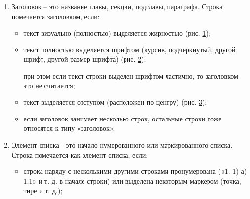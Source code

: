 \documentclass{ProcISPRAS}
\begin{document}
\begin{enumerate}
	\item Заголовок -- это название главы, секции, подглавы, параграфа. Строка помечается заголовком, если:
	\begin{itemize}
		\item текст визуально (полностью) выделяется жирностью (рис. \ref{fig:1});
		
		\begin{figure}[ht]
		    \label{fig:1}
		\end{figure}
		
		\item текст полностью выделяется шрифтом (курсив, подчеркнутый, другой шрифт, другой размер шрифта) (рис. \ref{fig:2});
		
		\begin{figure}[ht]
		    \label{fig:2}
		\end{figure}
		
		при этом если текст строки выделен шрифтом частично, то заголовком это не считается;
		
		\item текст выделяется отступом (расположен по центру) (рис. \ref{fig:3});
		
		\begin{figure}[ht]
		    \label{fig:3}
		\end{figure}
		
		\item если заголовок занимает несколько строк, остальные строки тоже относятся к типу «заголовок».
	\end{itemize}
	
	\item Элемент списка - это начало нумерованного или маркированного списка. Строка помечается как элемент списка, если:
	\begin{itemize}
		\item строка наряду с несколькими другими строками пронумерована («1. 1) а) 1.1» и т. д. в начале строки) или выделена некоторым маркером (точка, тире и т. д.);
		

\end{itemize}
\end{enumerate}
\end{document}
